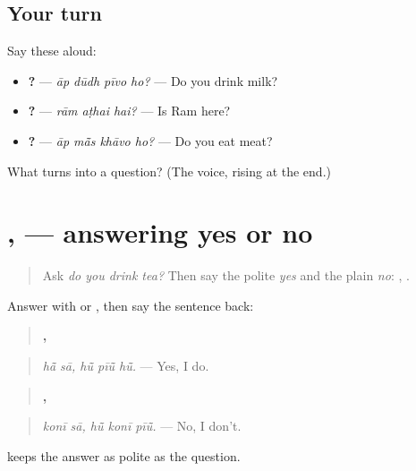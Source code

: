 \subsection*{Your turn}
Say these aloud:

\begin{itemize}
\raggedright
  \item \textbf{   ?} — \emph{āp dūdh pīvo ho?} — Do you drink milk?
  \item \textbf{  ?} — \emph{rām aṭhai hai?} — Is Ram here?
  \item \textbf{   ?} — \emph{āp mā̃s khāvo ho?} — Do you eat meat?
\end{itemize}

\begin{tcolorbox}[breakable,colback=teal!4,colframe=teal!35!black,title={Before you move on}]
What turns \textbf{  } into a question? (The voice, rising at the end.)
\end{tcolorbox}
\section[\texorpdfstring{\mw{हां} \mw{सा} · \mw{कोनी} \mw{सा} (hā̃ sā · konī sā)}{हां सा · कोनी सा (hā̃ sā · konī sā)}]{ ,   — answering yes or no}

\label{lesson:MW-C158-answer}



\begin{quote}
Ask \emph{do you drink tea?} Then say the polite \emph{yes} and the plain \emph{no}: \textbf{ }, \textbf{}.
\end{quote}

\begin{grammarlens}[title={Grammar Lens: the answer, then the sentence}]
Answer with \textbf{ } or \textbf{ }, then say the sentence back:

\begin{quote}
\textbf{ ,   }
\end{quote}

\begin{quote}
\emph{hā̃ sā, hū̃ pīū̃ hū̃.} — Yes, I do.
\end{quote}

\begin{quote}
\textbf{ ,   }
\end{quote}

\begin{quote}
\emph{konī sā, hū̃ konī pīū̃.} — No, I don't.
\end{quote}

\textbf{} keeps the answer as polite as the question.
\end{grammarlens}

